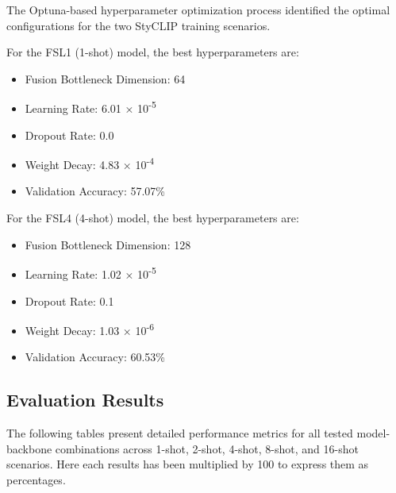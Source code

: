 \documentclass[conference,6pt]{IEEEtran}
\begin{document}
The Optuna-based hyperparameter optimization process identified the optimal configurations for the two StyCLIP training scenarios.

For the FSL1 (1-shot) model, the best hyperparameters are:
\begin{itemize}
    \item Fusion Bottleneck Dimension: 64
    \item Learning Rate: 6.01 × 10\textsuperscript{-5}
    \item Dropout Rate: 0.0
    \item Weight Decay: 4.83 × 10\textsuperscript{-4}
    \item Validation Accuracy: 57.07\%
\end{itemize}

For the FSL4 (4-shot) model, the best hyperparameters are:
\begin{itemize}
    \item Fusion Bottleneck Dimension: 128
    \item Learning Rate: 1.02 × 10\textsuperscript{-5}
    \item Dropout Rate: 0.1
    \item Weight Decay: 1.03 × 10\textsuperscript{-6}
    \item Validation Accuracy: 60.53\%
\end{itemize}

\subsection{Evaluation Results}
The following tables present detailed performance metrics for all tested model-backbone combinations across 1-shot, 2-shot, 4-shot, 8-shot, and 16-shot scenarios. Here each results has been multiplied by 100 to express them as percentages.
\end{document}
